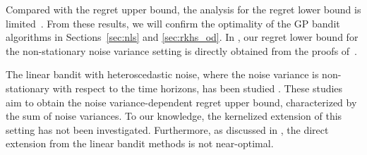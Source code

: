 Compared with the regret upper bound, the analysis for the regret lower bound is limited~\citep{bull2011convergence,scarlett2017lower,cai2021on,vakili2022open}.
%
From these results, we will confirm the optimality of the GP bandit algorithms in Sections~\ref{sec:nls} and \ref{sec:rkhs_od}.
%
In , our regret lower bound for the non-stationary noise variance setting is directly obtained from the proofs of~\citep{bull2011convergence,scarlett2017lower}.



The linear bandit with heteroscedastic noise, where the noise variance is non-stationary with respect to the time horizons, has been studied \citep{zhou2021nearly,zhang2021improved,kim2022improved,zhou2022computationally,zhao2023variance}.
%
These studies aim to obtain the noise variance-dependent regret upper bound, characterized by the sum of noise variances.
%
To our knowledge, the kernelized extension of this setting has not been investigated.
%
Furthermore, as discussed in , the direct extension from the linear bandit methods is not near-optimal.




